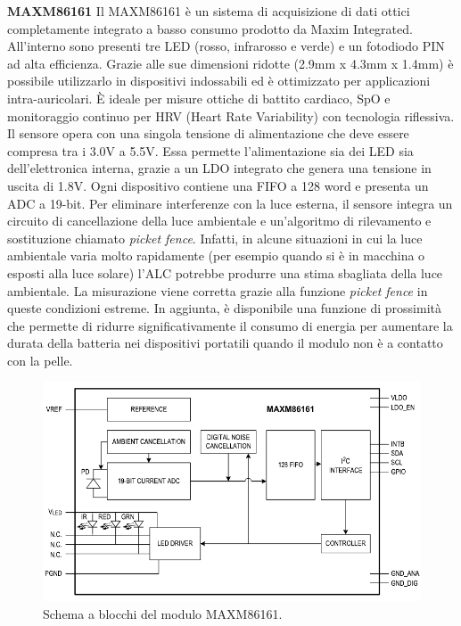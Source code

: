 \textbf{MAXM86161} Il MAXM86161 è un sistema di acquisizione di dati ottici completamente integrato a basso consumo prodotto da Maxim Integrated\cite{IntegratedMAXM86161}. All'interno sono presenti tre LED (rosso, infrarosso e verde) e un fotodiodo PIN ad alta efficienza. Grazie alle sue dimensioni ridotte (2.9mm x 4.3mm x 1.4mm) è possibile utilizzarlo in dispositivi indossabili ed è ottimizzato per applicazioni intra-auricolari. \`E ideale per misure ottiche di battito cardiaco, SpO e monitoraggio continuo per HRV (Heart Rate Variability) con tecnologia riflessiva. Il sensore opera con una singola tensione di alimentazione che deve essere compresa tra i 3.0V a 5.5V. Essa permette l'alimentazione sia dei LED sia dell'elettronica interna, grazie a un LDO integrato che genera una tensione in uscita di 1.8V. Ogni dispositivo contiene una FIFO a 128 word e presenta un ADC a 19-bit. Per eliminare interferenze con la luce esterna, il sensore integra un circuito di cancellazione della luce ambientale e un'algoritmo di rilevamento e sostituzione chiamato \textit{picket fence}. Infatti, in alcune situazioni in cui la luce ambientale varia molto rapidamente (per esempio quando si è in macchina o esposti alla luce solare) l'ALC potrebbe produrre una stima sbagliata della luce ambientale. La misurazione viene corretta grazie alla funzione \textit{picket fence} in queste condizioni estreme. In aggiunta, è disponibile una funzione di prossimità che permette di ridurre significativamente il consumo di energia per aumentare la durata della batteria nei dispositivi portatili quando il modulo non è a contatto con la pelle. 
\begin{figure}[h]
	\centering
	\includegraphics[width=0.9\linewidth]{ImageFiles/Fotopletismografia/MAXM86161BlockDiagram}
	\caption{Schema a blocchi del modulo MAXM86161.}
	\label{fig:MAXM86161BlockDiagram}
\end{figure}

